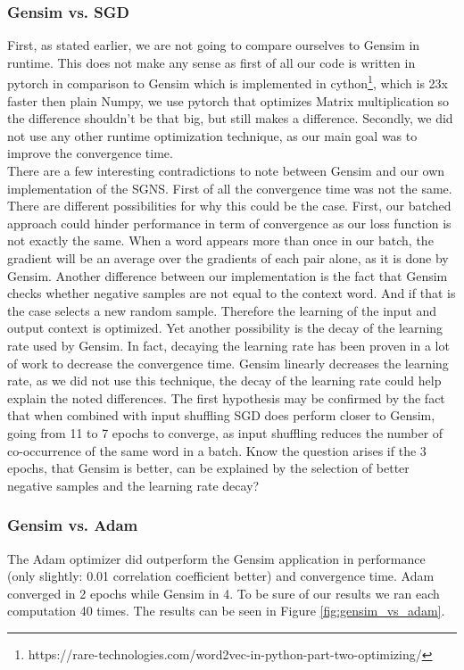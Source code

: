 \subsubsection{Gensim vs. SGD}
First, as stated earlier, we are not going to compare ourselves to Gensim in runtime. This does not make any sense as first of all our code is written in pytorch in comparison to Gensim which is implemented in cython\footnote{https://rare-technologies.com/word2vec-in-python-part-two-optimizing/}, which is 23x faster then plain Numpy, we use pytorch that optimizes Matrix multiplication so the difference shouldn't be that big, but still makes a difference. Secondly, we did not use any other runtime optimization technique, as our main goal was to improve the convergence time.\\
There are a few interesting contradictions to note between Gensim and our own implementation of the SGNS. First of all the convergence time was not the same. There are different possibilities for why this could be the case. First, our batched approach could hinder performance in term of convergence as our loss function is not exactly the same. When a word appears more than once in our batch, the gradient will be an average over the gradients of each pair alone, as it is done by Gensim. Another difference between our implementation is the fact that Gensim checks whether negative samples are not equal to the context word. And if that is the case selects a new random sample. Therefore the learning of the input and output context is optimized. Yet another possibility is the decay of the learning rate used by Gensim. In fact, decaying the learning rate has been proven in a lot of work to decrease the convergence time. Gensim linearly decreases the learning rate, as we did not use this technique, the decay of the learning rate could help explain the noted differences.
The first hypothesis may be confirmed by the fact that when combined with input shuffling SGD does perform closer to Gensim, going from 11 to 7 epochs to converge, as input shuffling reduces the number of co-occurrence of the same word in a batch. Know the question arises if the 3 epochs, that Gensim is better, can be explained by the selection of better negative samples and the learning rate decay?

\subsubsection{Gensim vs. Adam}
The Adam optimizer did outperform the Gensim application in performance (only slightly: 0.01 correlation coefficient better) and convergence time. Adam converged in 2 epochs while Gensim in 4. To be sure of our results we ran each computation 40 times. The results can be  seen in Figure \ref{fig:gensim_vs_adam}.

